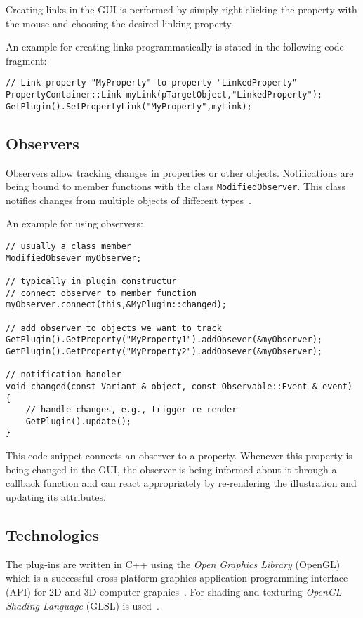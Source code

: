 Creating links in the GUI is performed by simply right clicking the property with the mouse and choosing the desired linking property.

An example for creating links programmatically is stated in the following code fragment:
\begin{lstlisting}
// Link property "MyProperty" to property "LinkedProperty"
PropertyContainer::Link myLink(pTargetObject,"LinkedProperty");
GetPlugin().SetPropertyLink("MyProperty",myLink);
\end{lstlisting}

\subsection{Observers}
\label{chap:observers}
Observers allow tracking changes in properties or other objects. Notifications are being bound to member functions with the class \texttt{ModifiedObserver}. This class notifies changes from multiple objects of different types~\cite{misc:volumeshop101}.

An example for using observers:
\begin{lstlisting}
// usually a class member
ModifiedObsever myObserver;

// typically in plugin constructur
// connect observer to member function
myObserver.connect(this,&MyPlugin::changed);

// add observer to objects we want to track
GetPlugin().GetProperty("MyProperty1").addObsever(&myObserver);
GetPlugin().GetProperty("MyProperty2").addObsever(&myObserver);

// notification handler
void changed(const Variant & object, const Observable::Event & event)
{
	// handle changes, e.g., trigger re-render
	GetPlugin().update();
}
\end{lstlisting}

This code snippet connects an observer to a property. Whenever this property is being changed in the GUI, the observer is being informed about it through a callback function and can react appropriately by re-rendering the illustration and updating its attributes.

\subsection{Technologies}
The plug-ins are written in C++ using the \emph{Open Graphics Library} (OpenGL) which is a successful cross-platform graphics application programming interface (API) for 2D and 3D computer graphics~\cite{book:computerGraphicsHill}. For shading and texturing \emph{OpenGL Shading Language} (GLSL) is used~\cite{misc:volumeshop101}.

